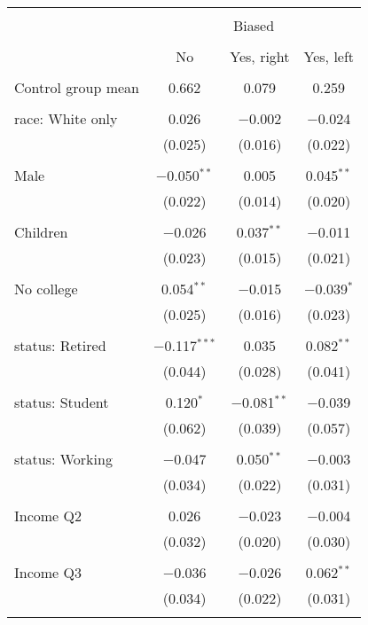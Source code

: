 
\begin{tabular}{@{\extracolsep{5pt}}lccc} 
\\[-1.8ex]\hline 
\hline \\[-1.8ex] 
 & \multicolumn{3}{c}{Biased} \\ 
\cline{2-4} 
\\[-1.8ex] & No & Yes, right & Yes, left \\ 
\hline \\[-1.8ex] 
 Control group mean & 0.662 & 0.079 & 0.259  \\ \hline \\[-1.8ex] race: White only & 0.026 & $-$0.002 & $-$0.024 \\ 
  & (0.025) & (0.016) & (0.022) \\ 
  & & & \\ 
 Male & $-$0.050$^{**}$ & 0.005 & 0.045$^{**}$ \\ 
  & (0.022) & (0.014) & (0.020) \\ 
  & & & \\ 
 Children & $-$0.026 & 0.037$^{**}$ & $-$0.011 \\ 
  & (0.023) & (0.015) & (0.021) \\ 
  & & & \\ 
 No college & 0.054$^{**}$ & $-$0.015 & $-$0.039$^{*}$ \\ 
  & (0.025) & (0.016) & (0.023) \\ 
  & & & \\ 
 status: Retired & $-$0.117$^{***}$ & 0.035 & 0.082$^{**}$ \\ 
  & (0.044) & (0.028) & (0.041) \\ 
  & & & \\ 
 status: Student & 0.120$^{*}$ & $-$0.081$^{**}$ & $-$0.039 \\ 
  & (0.062) & (0.039) & (0.057) \\ 
  & & & \\ 
 status: Working & $-$0.047 & 0.050$^{**}$ & $-$0.003 \\ 
  & (0.034) & (0.022) & (0.031) \\ 
  & & & \\ 
 Income Q2 & 0.026 & $-$0.023 & $-$0.004 \\ 
  & (0.032) & (0.020) & (0.030) \\ 
  & & & \\ 
 Income Q3 & $-$0.036 & $-$0.026 & 0.062$^{**}$ \\ 
  & (0.034) & (0.022) & (0.031) \\ 
  & & & \\ 

\end{tabular}

